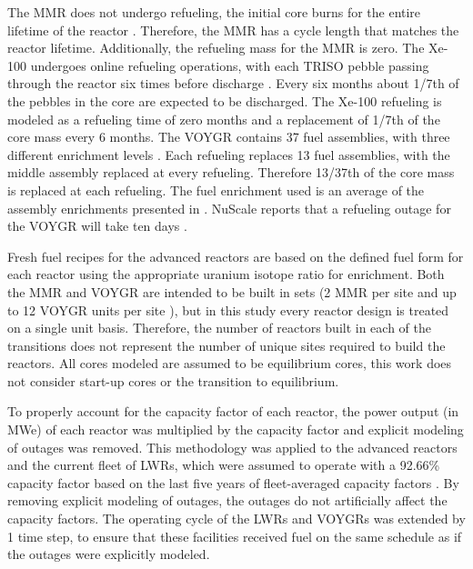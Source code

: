 The \gls{MMR} does not undergo refueling, the initial core
burns for the entire lifetime of the reactor \cite{mitchell_usnc_2020}. 
Therefore, the \gls{MMR} has a cycle length that 
matches the reactor lifetime. Additionally, the refueling mass for the
\gls{MMR} is zero. The Xe-100 undergoes online refueling operations, with 
each \gls{TRISO} pebble passing through the reactor six times before 
discharge \cite{mulder_overview_2021}. Every six months about 1/7th 
of the pebbles in the core are expected to be discharged. The Xe-100 
refueling is modeled as a refueling time of zero months and a 
replacement of 1/7th of the core mass every 6 months. 
The VOYGR contains 37 fuel assemblies, with three different enrichment 
levels \cite{nuscale_chapter_2020-1}. Each refueling replaces 13 fuel 
assemblies, with the middle assembly replaced at every refueling. 
Therefore 13/37th of the core mass is replaced at each refueling. 
The fuel enrichment used is an average of the assembly enrichments 
presented in \cite{nuscale_chapter_2020-1}. NuScale reports that a refueling 
outage for the VOYGR will take ten days \cite{nuscale_nuscale_2022}. 

Fresh fuel recipes for the advanced reactors are based on the 
defined fuel form for each reactor using the appropriate uranium isotope 
ratio for enrichment. Both the \gls{MMR} and VOYGR are intended to be built 
in sets (2 \gls{MMR} per site \cite{noauthor_usnc_2021} and up to 12 VOYGR 
units per site \cite{reyes_nuscale_2021}), but in this study every reactor 
design is treated 
on a single unit basis. Therefore, the number of reactors built in each 
of the transitions does not represent the number of unique sites required 
to build the reactors. All cores modeled are assumed to be equilibrium cores, 
this work does not consider start-up cores or the transition to equilibrium. 

To properly account for the capacity factor of each reactor, the power output 
(in MWe) of each reactor was multiplied by the capacity factor and explicit 
modeling of outages was removed. This methodology was applied to the 
advanced reactors and the current fleet of \glspl{LWR}, which were assumed 
to operate with a 92.66\% capacity factor based on the last five years of 
fleet-averaged capacity factors 
\cite{us_energy_information_administration_electric_2022}. 
By removing explicit modeling of outages, the outages do not artificially affect 
the capacity factors. The operating cycle of the \glspl{LWR} and VOYGRs 
was extended by 1 time step, to ensure that these facilities received fuel 
on the same schedule as if the outages were explicitly modeled. 

